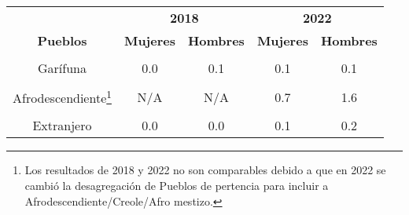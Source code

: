 \begin{tabular}[t]{ccccc}
\toprule
\multicolumn{1}{c}{\textbf{ }} & \multicolumn{2}{c}{\textbf{2018}} & \multicolumn{2}{c}{\textbf{2022}} \\
\cmidrule(l{3pt}r{3pt}){2-3} \cmidrule(l{3pt}r{3pt}){4-5}
\textbf{Pueblos} & \textbf{Mujeres} & \textbf{Hombres} & \textbf{Mujeres} & \textbf{Hombres}\\
\midrule
\cellcolor[HTML]{B6B3FF}{Maya} & \cellcolor[HTML]{B6B3FF}{10.7} & \cellcolor[HTML]{B6B3FF}{23.5} & \cellcolor[HTML]{B6B3FF}{11.6} & \cellcolor[HTML]{B6B3FF}{22.5}\\
Garífuna & 0.0 & 0.1 & 0.1 & 0.1\\
\cellcolor[HTML]{B6B3FF}{Xinka} & \cellcolor[HTML]{B6B3FF}{0.4} & \cellcolor[HTML]{B6B3FF}{1.4} & \cellcolor[HTML]{B6B3FF}{0.4} & \cellcolor[HTML]{B6B3FF}{0.8}\\
Afrodescendiente\footnote{Los resultados de 2018 y 2022 no son comparables debido a que en 2022 se cambió la desagregación de Pueblos de pertencia para incluir a Afrodescendiente/Creole/Afro mestizo.} & N/A & N/A & 0.7 & 1.6\\
\cellcolor[HTML]{B6B3FF}{Ladino} & \cellcolor[HTML]{B6B3FF}{22.8} & \cellcolor[HTML]{B6B3FF}{41.1} & \cellcolor[HTML]{B6B3FF}{24.8} & \cellcolor[HTML]{B6B3FF}{37.2}\\
Extranjero & 0.0 & 0.0 & 0.1 & 0.2\\
\bottomrule
\end{tabular}
